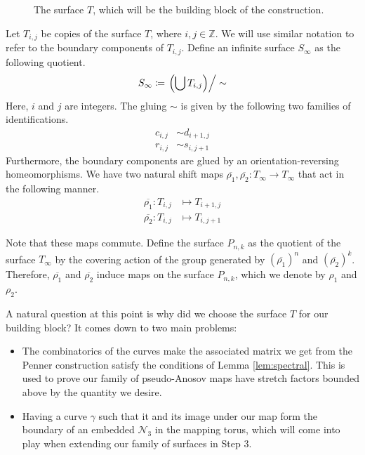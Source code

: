 \begin{figure}[]
    \centering
    \caption{The surface $T$, which will be the building block of the construction.}
    \label{fig:buildingblock}
\end{figure}

Let $T_{i,j}$ be copies of the surface $T$, where $i,j \in \mathbb{Z}$. We will use similar notation to refer
to the boundary components of $T_{i,j}$. Define an infinite surface $S_\infty$ as the following quotient.
\begin{align*}
  S_\infty \coloneqq \left. \left( \bigcup T_{i,j} \right)\right/\sim
\end{align*}
Here, $i$ and $j$ are integers. The gluing $\sim$ is given by the following two families of
identifications.
\begin{align*}
  c_{i,j} &\sim d_{i+1,j} \\
  r_{i,j} &\sim s_{i,j+1}
\end{align*}
Furthermore, the boundary components are glued by an orientation-reversing homeomorphisms.  We have two
natural shift maps $\overline{\rho_1},\overline{\rho_2}: T_\infty \to T_\infty$ that act in the
following manner.
\begin{align*}
  \overline{\rho_1}: T_{i,j} &\mapsto T_{i+1, j} \\
  \overline{\rho_2}: T_{i,j} &\mapsto T_{i, j+1}
\end{align*}

Note that these maps commute. Define the surface $P_{n,k}$ as the quotient of the surface $T_\infty$ by the
covering action of the group generated by $(\overline{\rho_1})^n$ and $(\overline{\rho_2})^k$. Therefore,
$\overline{\rho_1}$ and $\overline{\rho_2}$ induce maps on the surface $P_{n,k}$, which we denote by $\rho_1$
and $\rho_2$.

A natural question at this point is why did we choose the surface $T$ for our building block? It comes down to
two main problems:
\begin{itemize}
\item The combinatorics of the curves make the associated matrix we get from the Penner construction satisfy
  the conditions of Lemma \ref{lem:spectral}. This is used to prove our family of pseudo-Anosov maps have
  stretch factors bounded above by the quantity we desire.
\item Having a curve $\gamma$ such that it and its image under our map form the boundary of an embedded
  $\mathcal{N}_3$ in the mapping torus, which will come into play when extending our family of surfaces in
  Step 3.
\end{itemize}


